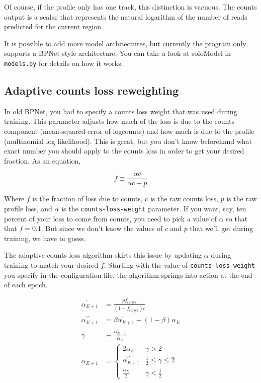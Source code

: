 \documentclass{article}
\begin{document}
Of course, if the profile only has one track, this distinction is vacuous.
The counts output is a scalar that represents the natural logarithm of the number of reads
predicted for the current region.

It is possible to add more model architectures, but currently the program only supports a
BPNet-style architecture.
You can take a look at soloModel in \texttt{models.py} for details on how it works.

\subsection{Adaptive counts loss reweighting}\label{sec:countsLossReweighting}
In old BPNet, you had to specify a counts loss weight that was used during training.
This parameter adjusts how much of the loss is due to the counts component
(mean-squared-error of logcounts) and how much is due to the profile (multinomial
log likelihood).
This is great, but you don't know beforehand what exact number you should apply to
the counts loss in order to get your desired fraction. As an equation,

\begin{equation}
    f \equiv \frac{\alpha c}{\alpha c + p}
\end{equation}

Where $f$ is the fraction of loss due to counts, $c$ is the raw counts loss, $p$ is the
raw profile loss, and $\alpha$ is the \texttt{counts-loss-weight} parameter.
If you want, say, ten percent of your loss to come from counts, you need to pick
a value of $\alpha$ so that that $f = 0.1$.
But since we don't know the values of $c$ and $p$ that we'll get during training,
we have to guess.

The adaptive counts loss algorithm skirts this issue by updating $\alpha$ during training
to match your desired $f$. Starting with the value of \texttt{counts-loss-weight} you
specify in the configuration file, the algorithm springs into action at the end of each epoch.

\begin{align}
    \alpha^\prime_{E+1} &= \frac{p f_{target}}{(1-f_{target}) c} \\
    \alpha^{\prime\prime}_{E+1} &= \beta \alpha^\prime_{E+1} + (1 - \beta) \alpha_{E} \\
    \gamma &\equiv \frac{\alpha^{\prime\prime}_{E+1}}{\alpha_E} \\
    \alpha_{E+1} &= 
    \begin{cases}
        2 \alpha_E & \gamma > 2 \\
        \alpha^{\prime\prime}_{E+1} & \frac{1}{2} \le \gamma \le 2 \\
        \frac{\alpha_E}{2} & \gamma < \frac{1}{2}
    \end{cases}
\end{align}
\end{document}
